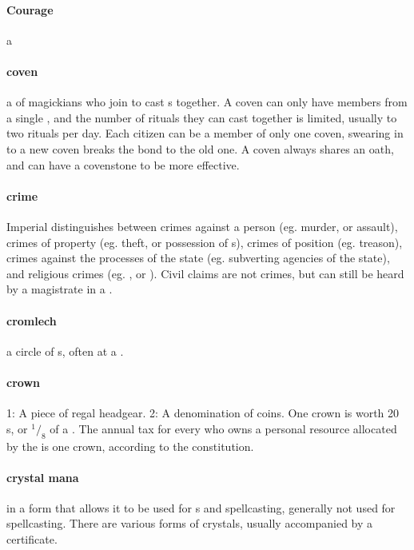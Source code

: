\paragraph{Courage} a 
\paragraph{coven} a  of magickians who join to cast s together. A coven can only have members from a single , and the number of rituals they can cast together is limited, usually to two rituals per day. Each citizen can be a member of only one coven, swearing in to a new coven breaks the bond to the old one. A coven always shares an oath, and can have a covenstone to be more effective. 
\paragraph{crime} Imperial  distinguishes between crimes against a person (eg. murder, or assault), crimes of property (eg. theft, or possession of s), crimes of position (eg. treason), crimes against the processes of the state (eg. subverting agencies of the state), and religious crimes (eg. , or ). Civil claims are not crimes, but can still be heard by a magistrate in a . 
\paragraph{cromlech}  a circle of s, often at a .
\paragraph{crown} 1: A piece of regal headgear. 2: A denomination of coins. One crown is worth 20 s, or $^1/_8$ of a . The annual tax for every  who owns a personal resource allocated by the  is one crown, according to the constitution.
\paragraph{crystal mana}  in a form that allows it to be used for s and spellcasting, generally not used for spellcasting. There are various forms of crystals, usually accompanied by a certificate.

